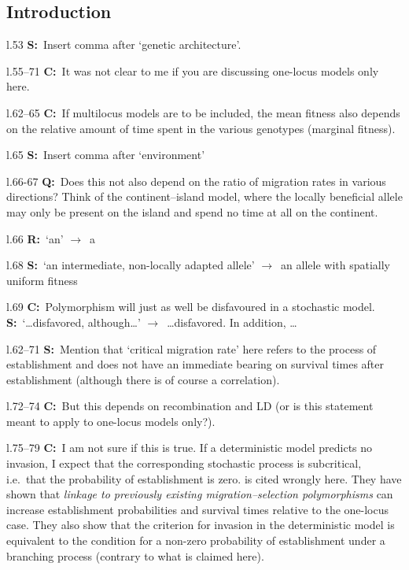 \documentclass[11pt]{article}
\newenvironment{my_description}
{\begin{description}
  \setlength{\itemsep}{2pt}
  \setlength{\parskip}{0pt}
  \setlength{\parsep}{0pt}}
{\end{description}}
\newcommand{\ra}{$\rightarrow$\ }
\newcommand{\C}{\textbf{C:}\ }
\newcommand{\Q}{\textbf{Q:}\ }
\newcommand{\R}{\textbf{R:}\ }
\newcommand{\V}{\textbf{S:}\ }
\begin{document}
\subsection{Introduction}
\begin{my_description}
	\item[l.53] \V Insert comma after `genetic architecture'.
	\item[l.55--71] \C It was not clear to me if you are discussing one-locus models only here.
	\item[l.62--65] \C If multilocus models are to be included, the mean fitness also depends on the relative amount of time spent in the various genotypes (marginal fitness).
	\item[l.65] \V Insert comma after `environment'
	\item[l.66-67] \Q Does this not also depend on the ratio of migration rates in various directions? Think of the continent--island model, where the locally beneficial allele may only be present on the island and spend no time at all on the continent.
	\item[l.66] \R `an' \ra a
	\item[l.68] \V `an intermediate, non-locally adapted allele' \ra an allele with spatially uniform fitness
	\item[l.69] \C Polymorphism will just as well be disfavoured in a stochastic model. \V `\dots disfavored, although\dots' \ra \dots disfavored. In addition, \dots
	\item[l.62--71] \V Mention that `critical migration rate' here refers to the process of establishment and does not have an immediate bearing on survival times after establishment (although there is of course a correlation).
	\item[l.72--74] \C But this depends on recombination and LD (or is this statement meant to apply to one-locus models only?).
	\item[l.75--79] \C I am not sure if this is true. If a deterministic model predicts no invasion, I expect that the corresponding stochastic process is subcritical, i.e.\ that the probability of establishment is zero. \cite{Aeschbacher:2014fk} is cited wrongly here. They have shown that \emph{linkage to previously existing migration--selection polymorphisms} can increase establishment probabilities and survival times relative to the one-locus case. They also show that the criterion for invasion in the deterministic model is equivalent to the condition for a non-zero probability of establishment under a branching process (contrary to what is claimed here).

\end{my_description}
\end{document}
